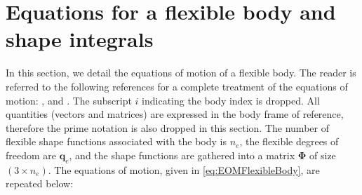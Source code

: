 \documentclass[wes, manuscript]{copernicus}
\renewcommand{\v}[1]{\boldsymbol{#1}}
\newcommand{\m}[1]{\boldsymbol{#1}}
\begin{document}
\section{Equations for a flexible body and shape integrals}
\label{sec:FlexibleDefinitions}
In this section, we detail the equations of motion of a flexible body. 
The reader is referred to the following references for a complete treatment of the equations of motion: \cite{shabana:book}, \cite{Schwertassek:book} and \cite{Wallrapp:1994}.
% 
% 
% 
The subscript $i$ indicating the body index is dropped.
All quantities (vectors and matrices) are expressed in the body frame of reference, therefore the prime notation is also dropped in this section.
The number of flexible shape functions associated with the body is $n_e$, the flexible degrees of freedom are $\v{q}_e$, and the shape functions are gathered into a matrix $\m{\Phi}$ of size $(3\times n_e)$. 
The equations of motion, given in \autoref{eq:EOMFlexibleBody}, are repeated below:
\end{document}
